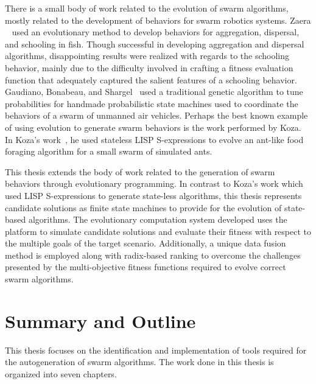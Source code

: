 There is a small body of work related to the evolution of swarm algorithms, mostly related to the development of behaviors for swarm robotics systems.  Zaera ~\cite{zaera:EvolveCollectiveBehavior} used an evolutionary method to develop behaviors for aggregation, dispersal, and schooling in fish.  Though successful in developing aggregation and dispersal algorithms, disappointing results were realized with regards to the schooling behavior, mainly due to the difficulty involved in crafting a fitness evaluation function that adequately captured the salient features of a schooling behavior.  Gaudiano, Bonabeau, and Shargel~\cite{gaudiano:EvolvingBehaviorsUAVs} used a traditional genetic algorithm to tune probabilities for  handmade probabilistic state machines used to coordinate the behaviors of a swarm of unmanned air vehicles.  Perhaps the best known example of using evolution to generate swarm behaviors is the work performed by Koza.   In Koza's work~\cite{koza:geneticprogramming-1}, he used stateless LISP S-expressions to evolve an ant-like food foraging algorithm for a small swarm of simulated ants.

This thesis extends the body of work related to the generation of swarm behaviors through evolutionary programming.  In contrast to Koza's work which used LISP S-expressions to generate state-less algorithms, this thesis represents candidate solutions as finite state machines to provide for the evolution of state-based algorithms.  The evolutionary computation system developed uses the \SWEEP{} platform to simulate candidate solutions and evaluate their fitness with respect to the multiple goals of the target scenario.  Additionally, a unique data fusion method is employed along with radix-based ranking to overcome the challenges presented by the multi-objective fitness functions required to evolve correct swarm algorithms.

\section{Summary and Outline}

This thesis focuses on the identification and implementation of tools required for the autogeneration of swarm algorithms. The work done in this thesis is organized into seven chapters.

